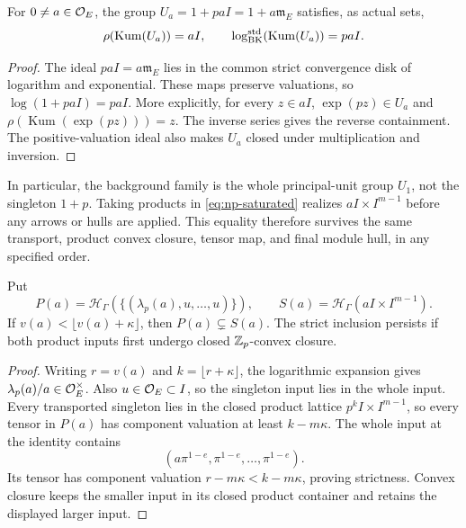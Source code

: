 \begin{proposition}
\label{prop:np-saturated}
For $0\ne a\in\mathcal O_E$, the group
$U_a=1+paI=1+a\mathfrak m_E$ satisfies, as actual sets,
\begin{equation}\label{eq:np-saturated}
 \rho(\operatorname{Kum}(U_a))=aI,\qquad
 \log_{\rm BK}^{\rm std}(\operatorname{Kum}(U_a))=paI.
\end{equation}
\end{proposition}
\begin{proof}
The ideal $paI=a\mathfrak m_E$ lies in the common strict convergence
disk of logarithm and exponential. These maps preserve valuations,
so $\log(1+paI)=paI$. More explicitly, for every $z\in aI$,
$\exp(pz)\in U_a$ and
$\rho(\operatorname{Kum}(\exp(pz)))=z$. The inverse series gives
the reverse containment. The positive-valuation ideal also makes
$U_a$ closed under multiplication and inversion.
\end{proof}

In particular, the background family is the whole principal-unit
group $U_1$, not the singleton $1+p$. Taking products in
\eqref{eq:np-saturated} realizes $aI\times I^{m-1}$ before
any arrows or hulls are applied. This equality therefore survives
the same transport, product convex closure, tensor map, and final
module hull, in any specified order.

\begin{proposition}
\label{prop:np-strict}
Put
\[
 P(a)=\mathcal H_\Gamma(\{(\lambda_p(a),u,\ldots,u)\}),\qquad
 S(a)=\mathcal H_\Gamma(aI\times I^{m-1}).
\]
If $v(a)<\lfloor v(a)+\kappa\rfloor$, then $P(a)\subsetneq S(a)$.
The strict inclusion persists if both product inputs first undergo
closed $\mathbb Z_p$-convex closure.
\end{proposition}
\begin{proof}
Writing $r=v(a)$ and $k=\lfloor r+\kappa\rfloor$, the logarithmic
expansion gives $\lambda_p(a)/a\in\mathcal O_E^\times$. Also
$u\in\mathcal O_E\subset I$, so the singleton input lies in the whole
input. Every transported singleton lies in the closed product
lattice $p^kI\times I^{m-1}$, so every tensor in $P(a)$ has
component valuation at least $k-m\kappa$.
The whole input at the identity contains
\[
                   (a\pi^{1-e},\pi^{1-e},\ldots,\pi^{1-e}).
\]
Its tensor has component valuation $r-m\kappa<k-m\kappa$,
proving strictness. Convex closure keeps the smaller input in its
closed product container and retains the displayed larger input.
\end{proof}

